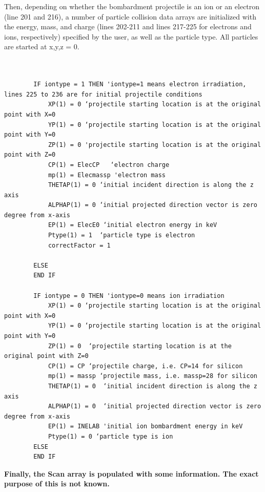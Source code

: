 \documentclass[10pt, reqno]{exam}
\begin{document}
Then, depending on whether the bombardment projectile is an ion or an electron (line 201 and 216), a number of particle collision data arrays are initialized with the energy, mass, and charge (lines 202-211 and lines 217-225 for electrons and ions, respectively) specified by the user, as well as the particle type. All particles are started at x,y,z = 0. \par
\begin{verbatim}
    

        IF iontype = 1 THEN 'iontype=1 means electron irradiation, lines 225 to 236 are for initial projectile conditions
            XP(1) = 0 ‘projectile starting location is at the original point with X=0
            YP(1) = 0 ‘projectile starting location is at the original point with Y=0
            ZP(1) = 0 'projectile starting location is at the original point with Z=0
            CP(1) = ElecCP   ‘electron charge
            mp(1) = Elecmassp 'electron mass
            THETAP(1) = 0 ‘initial incident direction is along the z axis
            ALPHAP(1) = 0 ‘initial projected direction vector is zero degree from x-axis
            EP(1) = ElecE0 ‘initial electron energy in keV
            Ptype(1) = 1  ‘particle type is electron
            correctFactor = 1  
    
        ELSE
        END IF
    
        IF iontype = 0 THEN 'iontype=0 means ion irradiation
            XP(1) = 0 ‘projectile starting location is at the original point with X=0
            YP(1) = 0 ‘projectile starting location is at the original point with Y=0
            ZP(1) = 0  ‘projectile starting location is at the original point with Z=0
            CP(1) = CP ‘projectile charge, i.e. CP=14 for silicon 
            mp(1) = massp ‘projectile mass, i.e. massp=28 for silicon
            THETAP(1) = 0  ‘initial incident direction is along the z axis
            ALPHAP(1) = 0  ‘initial projected direction vector is zero degree from x-axis
            EP(1) = INELAB 'initial ion bombardment energy in keV
            Ptype(1) = 0 ‘particle type is ion
        ELSE
        END IF
\end{verbatim}
\textbf{Finally, the Scan array is populated with some information. The exact purpose of this is not known.}
\end{document}
